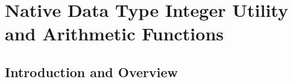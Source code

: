 \chapter{Native Data Type Integer Utility and Arithmetic Functions}
\label{cafn0}

\section{Introduction and Overview}
\label{cafn0:siov0}

